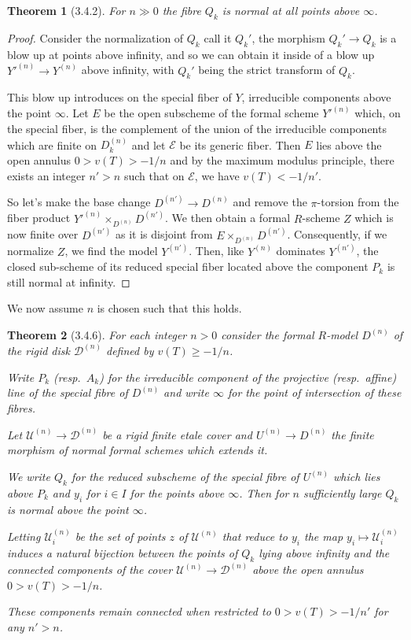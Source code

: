 \documentclass[oneside,12pt,]{article}
\newtheorem{theorem}{Theorem}
\newcommand{\gt}{>}
\begin{document}
\begin{theorem}[3.4.2]
    For $n \gg 0$ the fibre $Q_k$ is normal at all points above $\infty $.
\end{theorem}
\begin{proof}
    Consider the normalization of $Q_k$ call it $Q_k'$, the morphism $Q_k' \to Q_k$ is a blow up at points above infinity, and so we can obtain it inside of a blow up ${Y'}^{(n)} \to Y^{(n)}$ above infinity, with $Q_k'$ being the strict transform of $Q_k$.


    This blow up introduces on the special fiber of $Y$, irreducible components above the point $\infty $. Let $E$ be the open subscheme of the formal scheme ${Y'}^{(n)}$ which, on the special fiber, is the complement of the union of the irreducible components which are finite on $D_k^{(n)}$ and let $\mathscr E$ be its generic fiber. Then $E$ lies above the open annulus $0 > v(T)> - 1 / n$ and by the maximum modulus principle, there exists an integer $n' \gt n$ such that on $\mathscr E$, we have $v(T) < -1/n'$.


    So let's make the base change $D^{(n')} \to D^{(n)}$ and remove the $\pi $-torsion  from the fiber product ${Y'}^{(n)} \times_{D^{(n)}} {D^{(n')}}$. We then obtain a formal $R$-scheme $Z$ which is now finite over $D^{(n')}$ as it is disjoint from $E \times_{D^{(n)}} D^{(n')}$. Consequently, if we normalize $Z$, we find the model $Y^{(n')}$. Then, like $Y^{(n)}$ dominates $Y^{(n')}$, the closed sub-scheme of its reduced special fiber located above the component $P_k$ is still normal at infinity.
\end{proof}

We now assume $n$ is chosen such that this holds.

\begin{theorem}[3.4.6]
    For each integer $n \gt 0$ consider the formal $R$-model $D^{(n)}$ of the rigid disk $\mathscr D^{(n)}$ defined by $v(T) \ge - 1/n$.

    Write $P_k$ (resp.\ $A_k$) for the irreducible component of the projective (resp.\ affine) line of the special fibre of $D^{(n)}$ and write $\infty $ for the point of intersection of these fibres.

    Let $\mathscr U^{(n)} \to \mathscr D^{(n)}$ be a rigid finite etale cover and $U^{(n)} \to D^{(n)}$ the finite morphism of normal formal schemes which extends it.

    We write $Q_k$ for the reduced subscheme of the special fibre of $U^{(n)}$ which lies above $P_k$ and $y_i$ for $i\in I$ for the points above $\infty $. Then for $n$ sufficiently large $Q_k$ is normal above the point $\infty $.

    Letting $\mathscr U_i^{(n)}$ be the set of points $z$ of $\mathscr U^{(n)}$ that reduce to $y_i$ the map $y_i \mapsto \mathscr U_i^{(n)}$ induces a natural bijection between the points of $Q_k$ lying above infinity and the connected components of the cover $\mathscr U^{(n)} \to \mathscr D^{(n)}$ above the open annulus $0 \gt   v(T) \gt   -1/n$.

    These components remain connected when restricted to $0\gt  v(T)\gt   -1/n'$ for any $n' \gt n$.
\end{theorem}
\end{document}
